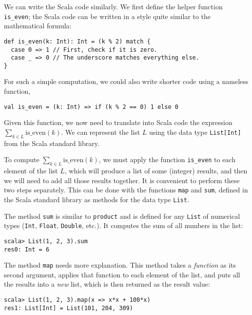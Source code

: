 We can write the Scala code similarly. We first define the helper
function \lstinline!is_even!; the Scala code can be written in a
style quite similar to the mathematical formula:

\begin{lstlisting}
def is_even(k: Int): Int = (k % 2) match {
  case 0 => 1 // First, check if it is zero.
  case _ => 0 // The underscore matches everything else.
}
\end{lstlisting}

For such a simple computation, we could also write shorter code using
a nameless function,

\begin{lstlisting}
val is_even = (k: Int) => if (k % 2 == 0) 1 else 0
\end{lstlisting}

Given this function, we now need to translate into Scala code the
expression $\sum_{k\in L}\text{is\_even}\left(k\right)$. We can represent
the list $L$ using the data type \lstinline!List[Int]! from the
Scala standard library.

To compute $\sum_{k\in L}\text{is\_even}\left(k\right)$, we must
apply the function \texttt{}\lstinline!is_even! to each element
of the list $L$, which will produce a list of some (integer) results,
and then we will need to add all those results together. It is convenient
to perform these two steps separately. This can be done with the functions
\texttt{}\lstinline!map! and \lstinline!sum!, defined in the Scala
standard library as methods for the data type \lstinline!List!.

The method \texttt{}\lstinline!sum! is similar to \lstinline!product!
and is defined for any \lstinline!List! of numerical types (\lstinline!Int!,
\lstinline!Float!, \lstinline!Double!, etc.). It computes the sum
of all numbers in the list:
\begin{lstlisting}
scala> List(1, 2, 3).sum
res0: Int = 6
\end{lstlisting}

The method \texttt{}\lstinline!map! needs more explanation. This
method takes a \emph{function} as its second argument, applies that
function to each element of the list, and puts all the results into
a \emph{new }list, which is then returned as the result value:

\begin{lstlisting}
scala> List(1, 2, 3).map(x => x*x + 100*x)
res1: List[Int] = List(101, 204, 309)
\end{lstlisting}

